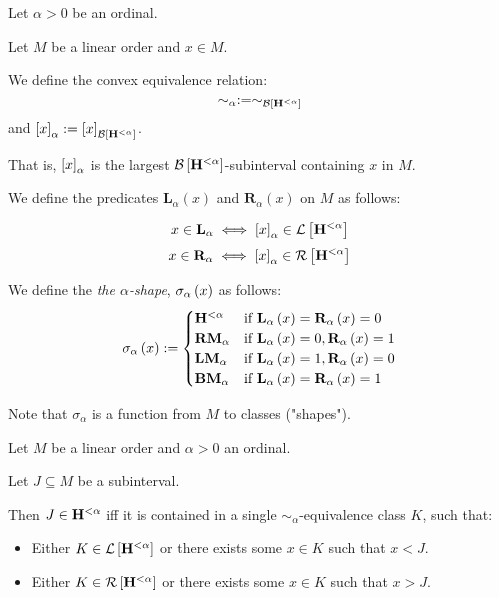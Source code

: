\begin{definition}
  Let $\alpha > 0$ be an ordinal.

  Let $M$ be a linear order and $x \in M$.

  We define the convex equivalence relation:
  \[\sim_\alpha := \sim_{\mathcal{B} \left[ {\mathbf{H}^{< \alpha}} \right]}\]
  and $\left[ {x} \right]_{\alpha} := \left[ {x} \right]_{\mathcal{B} \left[ {\mathbf{H}^{< \alpha}} \right]}$.

  That is,
  $\left[ {x} \right]_{\alpha}$ is the largest $\mathcal{B} \left[ {\mathbf{H}^{< \alpha}} \right]$-subinterval
  containing $x$ in $M$.

  We define the predicates $\mathbf{L}_{\alpha}(x)$ and $\mathbf{R}_{\alpha}(x)$ on $M$ as follows:

  \[
    x \in \mathbf{L}_{\alpha} \iff \left[ {x} \right]_{\alpha} \in \mathcal{L} \left[ {\mathbf{H}^{< \alpha}} \right]
  \]
  \[
    x \in \mathbf{R}_{\alpha} \iff \left[ {x} \right]_{\alpha} \in \mathcal{R} \left[ {\mathbf{H}^{< \alpha}} \right]
  \]

  We define the \emph{the $\alpha$-shape}, $\sigma_{\alpha} \left( {x} \right)$ as follows:
  \[
    \sigma_{\alpha} \left( {x} \right) := \begin{cases}
      \mathbf{H}^{< \alpha} & \text{if } \mathbf{L}_{\alpha} \left( {x} \right) = \mathbf{R}_{\alpha} \left( {x} \right) = 0    \\
      \mathbf{RM}_{\alpha}  & \text{if } \mathbf{L}_{\alpha} \left( {x} \right) = 0, \mathbf{R}_{\alpha} \left( {x} \right) = 1 \\
      \mathbf{LM}_{\alpha}  & \text{if } \mathbf{L}_{\alpha} \left( {x} \right) = 1, \mathbf{R}_{\alpha} \left( {x} \right) = 0 \\
      \mathbf{BM}_{\alpha}  & \text{if } \mathbf{L}_{\alpha} \left( {x} \right) = \mathbf{R}_{\alpha} \left( {x} \right) = 1
    \end{cases}
  \]

  Note that $\sigma_{\alpha}$ is a function from $M$ to classes ("shapes").
\end{definition}

\begin{lemma}\label{alpha-expressible}
  Let $M$ be a linear order and $\alpha > 0$ an ordinal.

  Let $J \subseteq M$ be a subinterval.

  Then $J \in \mathbf{H}^{< \alpha}$ iff
  it is contained in a single $\sim_{\alpha}$-equivalence class $K$, such that:
  \begin{itemize}
    \item Either $K \in \mathcal{L} \left[ {\mathbf{H}^{< \alpha}} \right]$ or
          there exists some $x \in K$ such that $x < J$.
    \item Either $K \in \mathcal{R} \left[ {\mathbf{H}^{< \alpha}} \right]$ or
          there exists some $x \in K$ such that $x > J$.
  \end{itemize}
\end{lemma}

